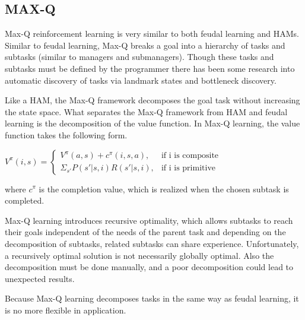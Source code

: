 \subsection{MAX-Q}
Max-Q reinforcement learning \cite{Dietterich} is very similar to both feudal learning and
HAMs. Similar to feudal learning, Max-Q breaks a goal into a hierarchy of tasks
and subtasks (similar to managers and submanagers). Though these tasks and
subtasks must be defined by the programmer there has been some research into
automatic discovery of tasks via landmark states and bottleneck discovery.

Like a HAM, the Max-Q framework decomposes the goal task without increasing
the state space. What separates the Max-Q framework from HAM and feudal
learning is the decomposition of the value function. In Max-Q learning, the
value function takes the following form.

\begin{math}
V^{\pi}(i, s) =
\begin{cases}
V^{\pi}(a, s) + c^{\pi}(i, s, a), & \text{if i is composite}\\
\Sigma_{s'}P(s'|s, i)R(s'|s, i), & \text{if i is primitive}
\end{cases}
\end{math}

where $c^{\pi}$ is the completion value, which is realized when the chosen
subtask is completed.

Max-Q learning introduces recursive optimality, which allows subtasks to reach
their goals independent of the needs of the parent task and depending on the
decomposition of subtasks, related subtasks can share experience. Unfortunately,
a recursively optimal solution is not necessarily globally optimal. Also
the decomposition must be done manually, and a poor decomposition could lead
to unexpected results.

Because Max-Q learning decomposes tasks in the same way as feudal learning, it is no more flexible in application.

